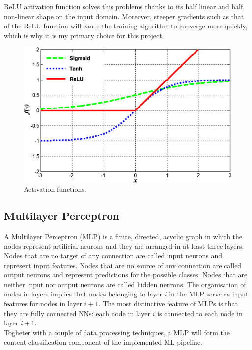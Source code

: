 ReLU activation function solves this problems thanks to its half linear and half non-linear shape on the input domain. Moreover, steeper gradients such as that of the ReLU function will cause the training algorithm to converge more quickly, which is why it is my primary choice for this project.

\begin{figure}[H]
  \centering
  \includegraphics[scale=0.2]{Images/activation_functions2.png}
  \caption{Activation functions.}
  \label{activation_functions}
\end{figure}

\subsection{Multilayer Perceptron}

A Multilayer Perceptron (MLP) is a finite, directed, acyclic graph in which the nodes represent artificial neurons and they are arranged in at least three layers. Nodes that are no target of any connection are called input neurons and represent input features. Nodes that are no source of any connection are called output neurons and represent predictions for the possible classes. Nodes that are neither input nor output neurons are called hidden neurons. The organisation of nodes in layers implies that nodes belonging to layer $i$ in the MLP serve as input features for nodes in layer $i+1$. The most distinctive feature of MLPs is that they are fully connected NNs: each node in layer $i$ is connected to each node in layer $i+1$. \\

Togheter with a couple of data processing techniques, a MLP will form the content classification component of the implemented ML pipeline. 

